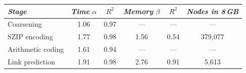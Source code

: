 \begin{tabular}{lccccc}
\toprule
\textit{Stage} & \textit{Time} $\alpha$ & $R^2$ & \textit{Memory} $\beta$ & $R^2$ & \textit{Nodes in 8\,GB} \\
\midrule
Coarsening & 1.06 & 0.97 & --- & --- & --- \\
SZIP encoding & 1.77 & 0.98 & 1.56 & 0.54 & 379,077 \\
Arithmetic coding & 1.61 & 0.94 & --- & --- & --- \\
Link prediction & 1.91 & 0.98 & 2.76 & 0.91 & 5,613 \\
\bottomrule
\end{tabular}
